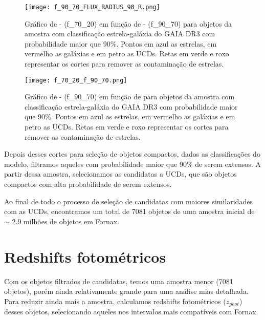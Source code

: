 \begin{figure}[!ht]
    \begin{center}
    \texttt{[image: f\_90\_70\_FLUX\_RADIUS\_90\_R.png]}
    \caption[]{Gráfico de  -  (f\_70\_20) em função de  -  (f\_90\_70) para objetos da amostra com classificação estrela-galáxia do GAIA DR3 com probabilidade maior que 90\%. Pontos em azul as estrelas, em vermelho as galáxias e em petro as UCDs. Retas em verde e roxo representar os cortes para remover as contaminação de estrelas.}
    \label{flux_radius_2}
    \end{center}
\end{figure}

\vspace{\baselineskip}

\begin{figure}[!ht]
    \begin{center}
    \texttt{[image: f\_70\_20\_f\_90\_70.png]}
    \caption[]{Gráfico de  -  (f\_90\_70) em função de  para objetos da amostra com classificação estrela-galáxia do GAIA DR3 com probabilidade maior que 90\%. Pontos em azul as estrelas, em vermelho as galáxias e em petro as UCDs. Retas em verde e roxo representar os cortes para remover as contaminação de estrelas.}
    \label{flux_radius_3}
    \end{center}
\end{figure}

\vspace{\baselineskip}

Depois desses cortes para seleção de objetos compactos, dados as classificações do modelo, filtramos aqueles com probabilidade maior que 90\% de serem extensos. A partir dessa amostra, selecionamos as candidatas a UCDs, que são objetos compactos com alta probabilidade de serem extensos.

\vspace{\baselineskip}

Ao final de todo o processo de seleção de candidatas com maiores similaridades com as UCDs, encontramos um total de 7081 objetos de uma amostra inicial de $\sim$ 2.9 milhões de objetos em Fornax. 

\section{Redshifts fotométricos}
Com os objetos filtrados de candidatas, temos uma amostra menor (7081 objetos), porém ainda relativamente grande para uma análise mias detalhada. Para reduzir ainda mais a amostra, calculamos redshifts fotométricos (\textit{$z_{phot}$}) desses objetos, selecionando aqueles nos intervalos mais compatíveis com Fornax.

